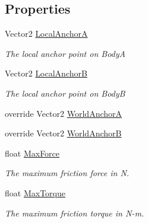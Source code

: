 \subsection*{Properties}
\begin{DoxyCompactItemize}
\item 
Vector2 \hyperlink{class_farseer_physics_1_1_dynamics_1_1_joints_1_1_friction_joint_a1eead46fa796aaadf6f81d545f6941b9}{Local\+Anchor\+A}
\begin{DoxyCompactList}\small\item\em The local anchor point on Body\+A \end{DoxyCompactList}\item 
Vector2 \hyperlink{class_farseer_physics_1_1_dynamics_1_1_joints_1_1_friction_joint_ae1256a87149846475ab5e0aca0608fd9}{Local\+Anchor\+B}
\begin{DoxyCompactList}\small\item\em The local anchor point on Body\+B \end{DoxyCompactList}\item 
override Vector2 \hyperlink{class_farseer_physics_1_1_dynamics_1_1_joints_1_1_friction_joint_acf3ccdea9c9bb259d1131b721920b178}{World\+Anchor\+A}
\item 
override Vector2 \hyperlink{class_farseer_physics_1_1_dynamics_1_1_joints_1_1_friction_joint_aa184754ddee2655a1b16f4ac30715b27}{World\+Anchor\+B}
\item 
float \hyperlink{class_farseer_physics_1_1_dynamics_1_1_joints_1_1_friction_joint_abed25a2da7b68b22907da910d8db154c}{Max\+Force}
\begin{DoxyCompactList}\small\item\em The maximum friction force in N. \end{DoxyCompactList}\item 
float \hyperlink{class_farseer_physics_1_1_dynamics_1_1_joints_1_1_friction_joint_ad38a960b1c97465ccad87aedadc931e5}{Max\+Torque}
\begin{DoxyCompactList}\small\item\em The maximum friction torque in N-\/m. \end{DoxyCompactList}\end{DoxyCompactItemize}
